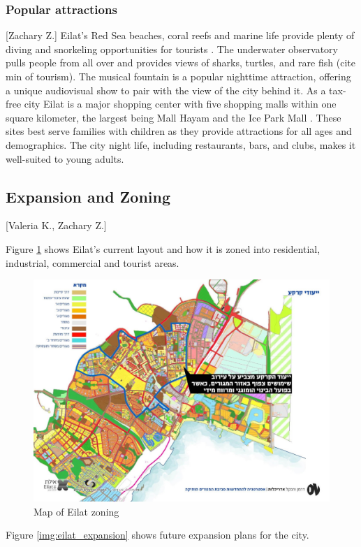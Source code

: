 \documentclass[12pt]{article}                       %
\begin{document}
\subsubsection{Popular attractions}[Zachary Z.]
Eilat's Red Sea beaches, coral reefs and marine life provide plenty of diving and snorkeling opportunities for tourists \cite{Benner2017UpgradingEilat}. The underwater 
observatory pulls people from all over and provides views of sharks, turtles, and rare fish (cite min of tourism). The musical fountain is a popular nighttime attraction, offering a unique audiovisual show to pair with the view of the city behind it. As a tax-free city Eilat is a major shopping center with five shopping malls within one square kilometer, the largest being Mall Hayam and the Ice Park Mall \cite{Benner2017UpgradingEilat}. These sites best serve families with children as they provide attractions for all ages and demographics. The city night life, including restaurants, bars, and clubs, makes it well-suited to young adults.

\subsection{Expansion and Zoning}[Valeria K., Zachary Z.]

Figure \ref{img:eilat_zoning} shows Eilat's current layout and how it is zoned into residential, industrial, commercial and tourist areas. 

\begin{figure}[H]
    \centering
    \includegraphics[width=12cm]{images/eilat_zoning.jpg}
    \caption{Map of Eilat zoning}
    \label{img:eilat_zoning}
\end{figure}
Figure \ref{img:eilat_expansion} shows future expansion plans for the city.
\end{document}
